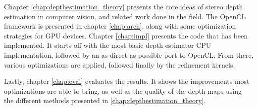 Chapter \ref{chap:depthestimation_theory} presents the core ideas of
stereo depth estimation in computer vision, and related work done in
the field. The OpenCL framework is presented in chapter
\ref{chap:arch}, along with some optimization strategies for GPU
devices. Chapter \ref{chap:impl} presents the code that has been
implemented. It starts off with the most basic depth estimator CPU
implementation, followed by an as direct as possible port to OpenCL.
From there, various optimizations are applied, followed finally by the
refinement kernels.

Lastly, chapter \ref{chap:eval} evaluates the results. It shows the
improvements most optimizations are able to bring, as well as the
quality of the depth maps using the different methods presented in
\ref{chap:depthestimation_theory}.
